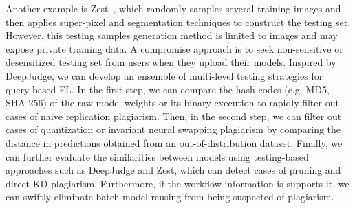 Another example is Zest~\cite{jia2022zest}, which randomly samples several training images and then applies super-pixel and segmentation techniques to construct the testing set.
However, this testing samples generation method is limited to images and may expose private training data.
A compromise approach is to seek non-sensitive or desensitized testing set from users when they upload their models.
Inspired by DeepJudge, we can develop an ensemble of multi-level testing strategies for query-based FL.
In the first step, we can compare the hash codes (e.g. MD5, SHA-256) of the raw model weights or its binary execution to rapidly filter out cases of naive replication plagiarism.
Then, in the second step, we can filter out cases of quantization or invariant neural swapping plagiarism by comparing the distance in predictions obtained from an out-of-distribution dataset.
Finally, we can further evaluate the similarities between models using testing-based approaches such as DeepJudge and Zest, which can detect cases of pruning and direct KD plagiarism.
Furthermore, if the workflow information is supports it, we can swiftly eliminate batch model reusing from being suspected of plagiarism.

